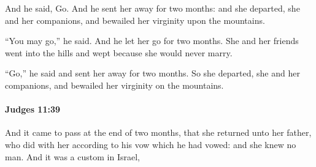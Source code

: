 			\begin{versebox}
					\item[BHS] 
					\item[ASV] And he said, Go. And he sent her away for two months: and she departed, she and her companions, and bewailed her virginity upon the mountains.
					\item[NIV] “You may go,” he said. And he let her go for two months. She and her friends went into the hills and wept because she would never marry.
					\item[NRSV] “Go,” he said and sent her away for two months. So she departed, she and her companions, and bewailed her virginity on the mountains.
			\end{versebox}

		\paragraph{Judges 11:39} %
			\label{JUDGES-11-39}

			And it came to pass at the end of two months, that she returned unto her father, who did with her according to his vow which he had vowed: and she knew no man. And it was a custom in Israel,

